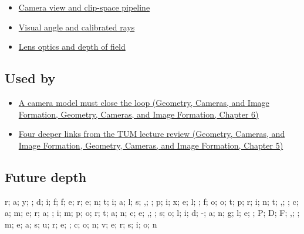 \begin{itemize}
\tightlist
\item
  \hyperref[appendix-1c07d64f5e70]{Camera view and clip-space pipeline}
\item
  \hyperref[appendix-7d356c396d1a]{Visual angle and calibrated rays}
\item
  \hyperref[appendix-21f8456e2629]{Lens optics and depth of field}
\end{itemize}

\subsection{Used by}\label{appendix-8c40fad29462-used-by}

\begin{itemize}
\tightlist
\item
  \href{../03-Geometry-Cameras-and-Image-Formation/main.pdf\#nameddest=02-foundations-ii-ch037-a-camera-model-must-close-the-loop}{A camera model must close the loop (Geometry, Cameras, and Image Formation, Geometry, Cameras, and Image Formation, Chapter 6)}
\item
  \href{../03-Geometry-Cameras-and-Image-Formation/main.pdf\#nameddest=02-foundations-ii-ch036-four-deeper-links-from-the-tum-lecture-review}{Four deeper links from the TUM lecture review (Geometry, Cameras, and Image Formation, Geometry, Cameras, and Image Formation, Chapter 5)}
\end{itemize}

\subsection{Future depth}\label{appendix-8c40fad29462-future-depth}

r; a; y; ; d; i; f; f; e; r; e; n; t; i; a; l; s; ,; ; p; i; x; e; l; ; f; o; o; t; p; r; i; n; t; ,; ; c; a; m; e; r; a; ; i; m; p; o; r; t; a; n; c; e; ,; ; s; o; l; i; d; -; a; n; g; l; e; ; P; D; F; ,; ; m; e; a; s; u; r; e; ; c; o; n; v; e; r; s; i; o; n
